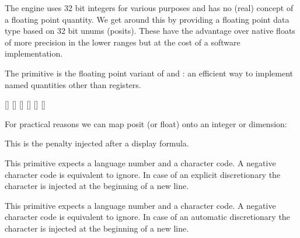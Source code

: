 \stopnewprimitive

\startnewprimitive[title={\prm {positdef}}]

The engine uses 32 bit integers for various purposes and has no (real) concept of
a floating point quantity. We get around this by providing a floating point data
type based on 32 bit unums (posits). These have the advantage over native floats
of more precision in the lower ranges but at the cost of a software
implementation.

The  primitive is the floating point variant of 
and : an efficient way to implement named quantities other
than registers.

\startbuffer
\positdef     {}
\positdef     {}
[\the\MyFloatA] [\todimension\MyFloatA] [\tointeger\MyFloatA]
[\the\MyFloatB] [\todimension\MyFloatB] [\tointeger\MyFloatB]
\stopbuffer

\typebuffer

For practical reasons we can map posit (or float) onto an integer or dimension:

\startlines
\getbuffer
\stoplines


\stopnewprimitive

\startoldprimitive[title={\prm {postdisplaypenalty}}]

This is the penalty injected after a display formula.

\stopoldprimitive

\startnewprimitive[title={\prm {postexhyphenchar}}]

This primitive expects a language number and a character code. A negative
character code is equivalent to ignore. In case of an explicit discretionary the
character is injected at the beginning of a new line.

\stopnewprimitive

\startnewprimitive[title={\prm {posthyphenchar}}]

This primitive expects a language number and a character code. A negative
character code is equivalent to ignore. In case of an automatic discretionary the
character is injected at the beginning of a new line.

\stopnewprimitive

\startnewprimitive[title={\prm {postinlinepenalty}}]

